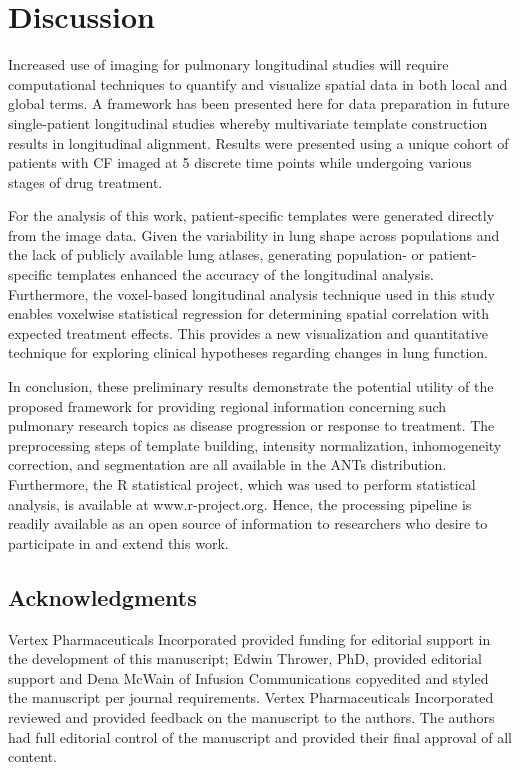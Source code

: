 \documentclass[11pt,]{article}
\begin{document}
\section{Discussion}\label{discussion}

Increased use of imaging for pulmonary longitudinal studies will require
computational techniques to quantify and visualize spatial data in both
local and global terms. A framework has been presented here for data
preparation in future single-patient longitudinal studies whereby
multivariate template construction results in longitudinal alignment.
Results were presented using a unique cohort of patients with CF imaged
at 5 discrete time points while undergoing various stages of drug
treatment.

For the analysis of this work, patient-specific templates were generated
directly from the image data. Given the variability in lung shape across
populations and the lack of publicly available lung atlases, generating
population- or patient-specific templates enhanced the accuracy of the
longitudinal analysis. Furthermore, the voxel-based longitudinal
analysis technique used in this study enables voxelwise statistical
regression for determining spatial correlation with expected treatment
effects. This provides a new visualization and quantitative technique
for exploring clinical hypotheses regarding changes in lung function.

In conclusion, these preliminary results demonstrate the potential
utility of the proposed framework for providing regional information
concerning such pulmonary research topics as disease progression or
response to treatment. The preprocessing steps of template building,
intensity normalization, inhomogeneity correction, and segmentation are
all available in the ANTs distribution. Furthermore, the R statistical
project, which was used to perform statistical analysis, is available at
www.r-project.org. Hence, the processing pipeline is readily available
as an open source of information to researchers who desire to
participate in and extend this work.

\clearpage

\subsection{Acknowledgments}\label{acknowledgments}

Vertex Pharmaceuticals Incorporated provided funding for editorial
support in the development of this manuscript; Edwin Thrower, PhD,
provided editorial support and Dena McWain of Infusion Communications
copyedited and styled the manuscript per journal requirements. Vertex
Pharmaceuticals Incorporated reviewed and provided feedback on the
manuscript to the authors. The authors had full editorial control of the
manuscript and provided their final approval of all content.
\end{document}
